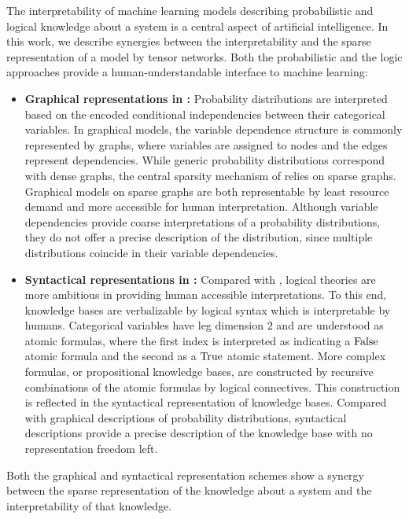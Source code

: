 The interpretability of machine learning models describing probabilistic and logical knowledge about a system is a central aspect of artificial intelligence.
In this work, we describe synergies between the interpretability and the sparse representation of a model by tensor networks.
Both the probabilistic and the logic approaches provide a human-understandable interface to machine learning:
\begin{itemize} %
    \item \textbf{Graphical representations in \probabilityTheory{}:} Probability distributions are interpreted based on the encoded conditional independencies between their categorical variables.
    In graphical models, the variable dependence structure is commonly represented by graphs, where variables are assigned to nodes and the edges represent dependencies.
    While generic probability distributions correspond with dense graphs, the central sparsity mechanism of \probabilityTheory{} relies on sparse graphs.
    Graphical models on sparse graphs are both representable by least resource demand and more accessible for human interpretation.
    Although variable dependencies provide coarse interpretations of a probability distributions, they do not offer a precise description of the distribution, since multiple distributions coincide in their variable dependencies.
    \item \textbf{Syntactical representations in \propositionalLogic{}:} Compared with \probabilityTheory{}, logical theories are more ambitious in providing human accessible interpretations.
    To this end, knowledge bases are verbalizable by logical syntax which is interpretable by humans.
    Categorical variables have leg dimension $2$ and are understood as atomic formulas, where the first index is interpreted as indicating a $\mathrm{False}$ atomic formula and the second as a $\mathrm{True}$ atomic statement.
    More complex formulas, or propositional knowledge bases, are constructed by recursive combinations of the atomic formulas by logical connectives.
    This construction is reflected in the syntactical representation of knowledge bases.
    Compared with graphical descriptions of probability distributions, syntactical descriptions provide a precise description of the knowledge base with no representation freedom left.
\end{itemize}
Both the graphical and syntactical representation schemes show a synergy between the sparse representation of the knowledge about a system and the interpretability of that knowledge.
